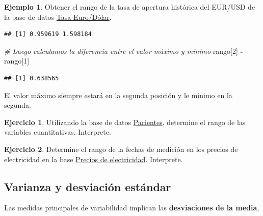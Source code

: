 \documentclass[
  11pt,
]{book}
\newenvironment{Shaded}{\begin{snugshade}}{\end{snugshade}}
\newcommand{\AttributeTok}[1]{\textcolor[rgb]{0.13,0.29,0.53}{#1}}
\newcommand{\CommentTok}[1]{\textcolor[rgb]{0.56,0.35,0.01}{\textit{#1}}}
\newcommand{\DecValTok}[1]{\textcolor[rgb]{0.00,0.00,0.81}{#1}}
\newcommand{\FunctionTok}[1]{\textcolor[rgb]{0.13,0.29,0.53}{\textbf{#1}}}
\newcommand{\NormalTok}[1]{#1}
\newcommand{\SpecialCharTok}[1]{\textcolor[rgb]{0.81,0.36,0.00}{\textbf{#1}}}
\theoremstyle{definition}
\theoremstyle{definition}
\newtheorem{example}{Ejemplo}[chapter]
\theoremstyle{definition}
\newtheorem{exercise}{Ejercicio}[chapter]
\theoremstyle{definition}
\theoremstyle{remark}
\begin{document}
\begin{example}
Obtener el rango de la tasa de apertura histórica del EUR/USD de la base de datos \hyperref[TasaEURUSD]{Tasa Euro/Dólar}.

\begin{Shaded}
\end{Shaded}

\begin{verbatim}
## [1] 0.959619 1.598184
\end{verbatim}

\begin{Shaded}
\begin{Highlighting}[]
\CommentTok{\# Luego calculamos la diferencia entre el valor máximo y mínimo}
\NormalTok{rango[}\DecValTok{2}\NormalTok{] }\SpecialCharTok{{-}}\NormalTok{ rango[}\DecValTok{1}\NormalTok{]}
\end{Highlighting}
\end{Shaded}

\begin{verbatim}
## [1] 0.638565
\end{verbatim}

El valor máximo siempre estará en la segunda posición y le mínimo en la segunda.
\end{example}

\begin{exercise}
Utilizando la base de datos \hyperref[Pacientes]{Pacientes}, determine el rango de las variables cuantitativas. Interprete.
\end{exercise}

\begin{exercise}
Determine el rango de la fechas de medición en los precios de electricidad en la base \hyperref[PreciosElectricidad]{Precios de electricidad}. Interprete.
\end{exercise}

\subsection{Varianza y desviación estándar}\label{topicos-medidas-escala-varianza-desviacion}

Las medidas principales de variabilidad implican las \textbf{desviaciones de la media},
\end{document}
